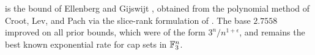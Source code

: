 \begin{remark}\label{rem:literature}
 is the bound of Ellenberg and Gijswijt \cite{ellenberggijswijt2017},
obtained from the polynomial method of Croot, Lev, and Pach \cite{crootlevpach2017}
via the slice-rank formulation of \cite{tao2016slicerank,bccgnsu2017}. The base
$2.7558$ improved on all prior bounds, which were of the form $3^n/n^{1+\epsilon}$,
and remains the best known exponential rate for cap sets in $\mathbb{F}_3^n$.
\end{remark}
